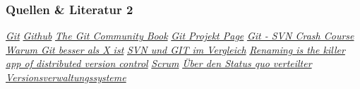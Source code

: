 \documentclass{beamer}
\begin{document}
\begin{frame}\frametitle{Quellen \& Literatur 2}
\begin{thebibliography}{9}
 \emph{\href{http://wiki.ubuntuusers.de/Git}{Git}}
 \emph{\href{https://github.com/features/projects}{Github}}
 \emph{\href{http://book.git-scm.com/index.html}{The Git Community Book}}
 \emph{\href{http://git-scm.com/}{Git Projekt Page}}
 \emph{\href{http://git.or.cz/course/svn.html}{Git - SVN Crash Course}}
 \emph{\href{http://de.whygitisbetterthanx.com/}{Warum Git besser als X ist}}
 \emph{\href{http://velian.dyndns.org/mediawiki/index.php/SVN\_und\_GIT\_im\_Vergleich}{SVN und GIT im Vergleich}}
 \emph{\href{http://www.markshuttleworth.com/archives/123}{Renaming is the killer app of distributed version control}}
 \emph{\href{http://www.scrum-day.de/index.html}{Scrum}}
 \emph{\href{http://www.heise.de/developer/artikel/Ueber-den-Status-quo-verteilter-Versionsverwaltungssysteme-1285649.html}{Über den Status quo verteilter Versionsverwaltungssysteme}}

\end{thebibliography}
\end{frame}
\end{document}
